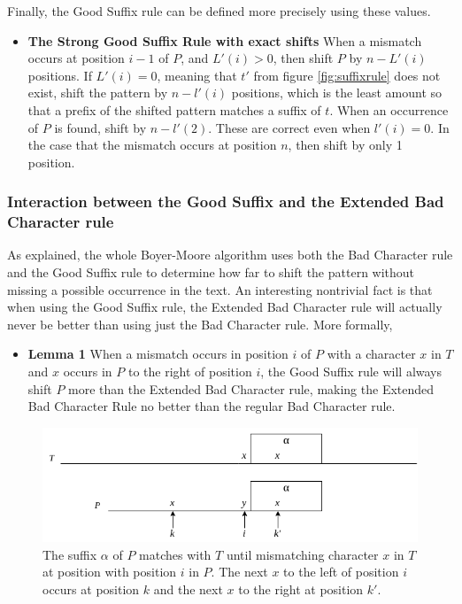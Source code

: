 Finally, the Good Suffix rule can be defined more precisely using these values. 

\begin{itemize}
    \item[] \textbf{The Strong Good Suffix Rule with exact shifts} When a mismatch occurs at position $i-1$ of $P$, and $L'(i)>0$, then shift $P$ by $n-L'(i)$ positions. If $L'(i)=0$, meaning that $t'$ from figure \ref{fig:suffixrule} does not exist, shift the pattern by $n-l'(i)$ positions, which is the least amount so that a prefix of the shifted pattern matches a suffix of $t$. When an occurrence of $P$ is found, shift by $n-l'(2)$. These are correct even when $l'(i)=0$. In the case that the mismatch occurs at position $n$, then shift by only 1 position. 
\end{itemize}


\subsubsection{Interaction between the Good Suffix and the Extended Bad Character rule}\label{sec:goodsuffixvsbadcharacter}

As explained, the whole Boyer-Moore algorithm uses both the Bad Character rule and the Good Suffix rule to determine how far to shift the pattern without missing a possible occurrence in the text. An interesting nontrivial fact is that when using the Good Suffix rule, the Extended Bad Character rule will actually never be better than using just the Bad Character rule. More formally,

\begin{itemize}
    \item[] \textbf{Lemma 1} When a mismatch occurs in position $i$ of $P$ with a character $x$ in $T$ and $x$ occurs in $P$ to the right of position $i$, the Good Suffix rule will always shift $P$ more than the Extended Bad Character rule, making the Extended Bad Character Rule no better than the regular Bad Character rule. 
\end{itemize}

\begin{figure}[t]
    \centering
    \includegraphics[width=\textwidth]{LaTeX/Figures/Zalg/suffixvsbadchar.png}
    \caption{The suffix $\alpha$ of $P$ matches with $T$ until mismatching character $x$ in $T$ at position with position $i$ in $P$. The next $x$ to the left of position $i$ occurs at position $k$ and the next $x$ to the right at position $k'$.}
    \label{fig:suffixvsbadchar}
\end{figure}

